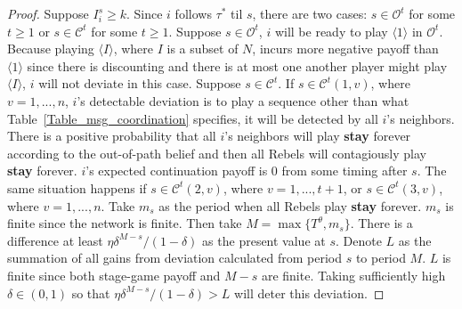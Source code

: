 \documentclass[12pt,letter]{article}
\newcommand{\Kappa}{\mathcal{C}}
\newcommand{\Omicron}{\mathcal{O}}
\theoremstyle{definition}
\theoremstyle{remark}
\theoremstyle{claim}
\begin{document}
\begin{proof}
Suppose $I^s_i\geq k$. Since $i$ follows $\tau^{*}$ til $s$, there are two cases: $s\in\Omicron^{t}$ for some $t\geq 1$ or $s\in \Kappa^t$ for some $t\geq 1$. Suppose $s\in\Omicron^{t}$, $i$ will be ready to play $\langle 1 \rangle$ in $\Omicron^{t}$. Because playing $\langle I \rangle$, where $I$ is a subset of $N$, incurs more negative payoff than $\langle 1 \rangle$ since there is discounting and there is at most one another player might play $\langle I \rangle$, $i$ will not deviate in this case.  Suppose $s\in\Kappa^{t}$. If $s\in \Kappa^t(1,v)$, where $v=1,...,n$, $i$'s detectable deviation is to play a sequence other than what Table~\ref{Table_msg_coordination} specifies, it will be detected by all $i$'s neighbors. There is a positive probability that all $i$'s neighbors will play \textbf{stay} forever according to the out-of-path belief and then all Rebels will contagiously play \textbf{stay} forever. $i$'s expected continuation payoff is 0 from some timing after $s$. The same situation happens if $s\in \Kappa^t(2,v)$, where $v=1,...,t+1$, or $s\in \Kappa^t(3,v)$, where $v=1,...,n$. Take $m_s$ as the period when all Rebels play \textbf{stay} forever. $m_s$ is finite since the network is finite. Then take $M=\max\{T^{\theta},m_s\}$. There is a difference at least $\eta\delta^{M-s}/(1-\delta)$ as the present value at $s$. Denote $L$ as the summation of all gains from deviation calculated from period $s$ to period $M$. $L$ is finite since both stage-game payoff and $M-s$ are finite. Taking sufficiently high $\delta\in(0,1)$ so that $\eta\delta^{M-s}/(1-\delta)>L$ will deter this deviation.
\end{proof}
\end{document}
